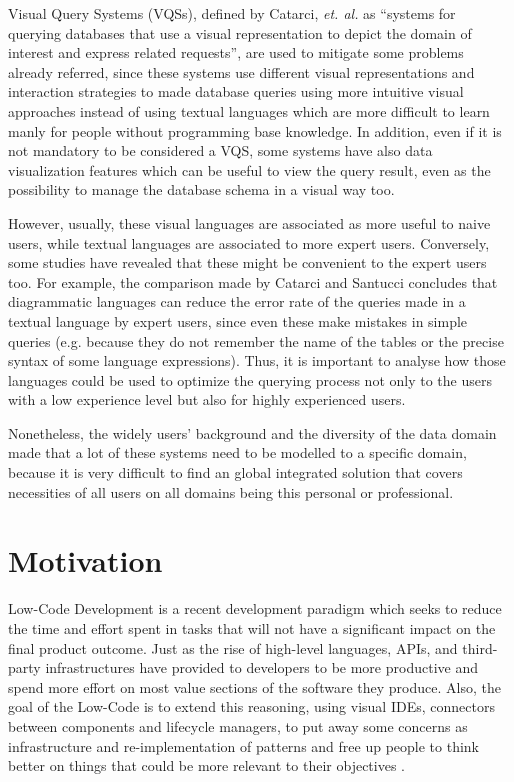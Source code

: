 Visual Query Systems (VQSs), defined by Catarci, \textit{et. al.} \cite{visualQuerySystemsForDatabases_aSurvey} as “systems for querying databases that use a visual representation to depict the domain of interest and express related requests”, are used to mitigate some problems already referred, since these systems use different visual representations and interaction strategies to made database queries using more intuitive visual approaches instead of using textual languages which are more difficult to learn manly for people without programming base knowledge. In addition, even if it is not mandatory to be considered a VQS, some systems have also data visualization features which can be useful to view the query result, even as the possibility to manage the database schema in a visual way too.

However, usually, these visual languages are associated as more useful to naive users, while textual languages are associated to more expert users.  Conversely, some studies have revealed that these might be convenient to the expert users too. For example, the comparison made by Catarci and Santucci \cite{diagrammaticVsTextualQueryLanguages_aComparativeExperiment} concludes that diagrammatic languages can reduce the error rate of the queries made in a textual language by expert users, since even these make mistakes in simple queries (e.g. because they do not remember the name of the tables or the precise syntax of some language expressions). Thus, it is important to analyse how those languages could be used to optimize the querying process not only to the users with a low experience level but also for highly experienced users.

 Nonetheless, the widely users’ background and the diversity of the data domain made that a lot of these systems need to be modelled to a specific domain, because it is very difficult to find an global integrated solution that covers necessities of all users on all domains being this personal or professional.

\section{Motivation}
\label{sec:motivation}

Low-Code Development is a recent development paradigm which seeks to reduce the time and effort spent in tasks that will not have a significant impact on the final product outcome. Just as the rise of high-level languages, APIs, and third-party infrastructures have provided to developers to be more productive and spend more effort on most value sections of the software they produce. Also, the goal of the Low-Code is to extend this reasoning, using visual IDEs, connectors between components and lifecycle managers, to put away some concerns as infrastructure and re-implementation of patterns and free up people to think better on things that could be more relevant to their objectives \cite{outsystems_whatIsLowCode}.

